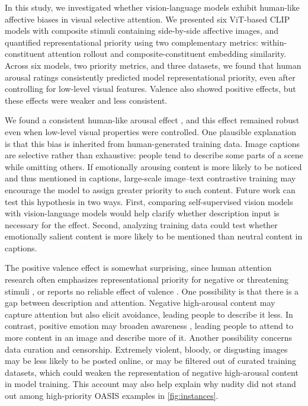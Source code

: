 \documentclass{article}
\begin{document}
In this study, we investigated whether vision-language models exhibit human-like affective biases in visual selective attention. We presented six ViT-based CLIP models with composite stimuli containing side-by-side affective images, and quantified representational priority using two complementary metrics: within-constituent attention rollout and composite-constituent embedding similarity. Across six models, two priority metrics, and three datasets, we found that human arousal ratings consistently predicted model representational priority, even after controlling for low-level visual features. Valence also showed positive effects, but these effects were weaker and less consistent.

We found a consistent human-like arousal effect \citep{vogtAllocationSpatialAttention2008b, schimmackAttentionalInterferenceEffects2005a, hansenFindingFaceCrowd1988a, ohmanEmotionDrivesAttention2001}, and this effect remained robust even when low-level visual properties were controlled. One plausible explanation is that this bias is inherited from human-generated training data. Image captions are selective rather than exhaustive: people tend to describe some parts of a scene while omitting others. If emotionally arousing content is more likely to be noticed and thus mentioned in captions, large-scale image--text contrastive training may encourage the model to assign greater priority to such content. Future work can test this hypothesis in two ways. First, comparing self-supervised vision models with vision-language models would help clarify whether description input is necessary for the effect. Second, analyzing training data could test whether emotionally salient content is more likely to be mentioned than neutral content in captions.

The positive valence effect is somewhat surprising, since human attention research often emphasizes representational priority for negative or threatening stimuli \citep{prattoAutomaticVigilanceAttentiongrabbing1991, hansenFindingFaceCrowd1988a, ohmanEmotionDrivesAttention2001}, or reports no reliable effect of valence \citep{schimmackAttentionalInterferenceEffects2005a, vogtAllocationSpatialAttention2008b}. One possibility is that there is a gap between description and attention. Negative high-arousal content may capture attention but also elicit avoidance, leading people to describe it less. In contrast, positive emotion may broaden awareness \citep{fredrickson2004broaden}, leading people to attend to more content in an image and describe more of it.  Another possibility concerns data curation and censorship. Extremely violent, bloody, or disgusting images may be less likely to be posted online, or may be filtered out of curated training datasets, which could weaken the representation of negative high-arousal content in model training. This account may also help explain why nudity did not stand out among high-priority OASIS examples in \cref{fig:instances}.
\end{document}
